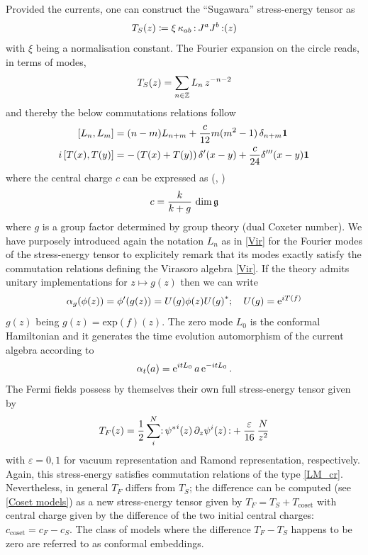 \bigskip
Provided the currents, one can construct the ``Sugawara''
stress-energy tensor as
\begin{equation}
\label{SET}
T_S(z)\coloneqq \xi\,\kappa_{ab}\,\wick{\,J^a J^b\,}(z)
\end{equation}
with $\xi$ being a normalisation constant. The
Fourier expansion on the circle reads, in terms of modes,
\[
T_S(z)=\sum_{n\in\mathbb{Z}} L_n\,z^{-n-2}
\]
and thereby the below commutations relations follow
\begin{align}
[L_n,L_m]&=(n-m)L_{n+m} + \frac{c}{12} m(m^2-1)\,
     \delta_{n+m}\bm{1}\notag \\ 
i\,[T(x),T(y)]&=-\left(T(x)+T(y)\right)\delta'(x-y)
     + \frac{c}{24}\delta'''(x-y)\bm{1} \label{LM_cr}
\end{align}
where the central charge $c$ can be expressed as 
(\cite{dFMS:1997}, \cite{Fuchs:1992})
\begin{equation}
\label{coxeter}
c=\frac{k}{k+g}\,\operatorname{dim}\mathfrak{g}
\end{equation}
where $g$ is a group factor determined by group theory (dual
Coxeter number). We have purposely introduced again the 
notation $L_n$ as in
\eqref{Vir} for the Fourier modes of the stress-energy tensor
to explicitely remark that its modes exactly satisfy the
commutation relations defining the Virasoro algebra \eqref{Vir}.
If the theory admits unitary implementations for $z\mapsto g(z)$
then we can write
\[
\alpha_g(\phi(z))=\phi'(g(z))=U(g)\phi(z){U(g)}^*;\quad
U(g)=\operatorname{e}^{iT(f)}
\]
$g(z)$ being $g(z)=\textrm{exp}(f)(z)$.
The zero mode $L_0$ is the conformal Hamiltonian
and it generates the time evolution automorphism
of the current algebra according to
\[
\alpha_t(a)=\operatorname{e}^{itL_0}a\operatorname{e}^{-itL_0}.
\]
The Fermi fields possess by themselves their own 
full stress-energy tensor given by 
\begin{equation}
\label{SET_vac_vs_R}
T_F(z)=\frac{1}{2} \sum_i^N\wick{\,{\psi^*}^i(z)\,
\partial_z\psi^i(z)\,} + \frac{\varepsilon}{16}\,\frac{N}{z^2}
\end{equation}
with $\varepsilon=0,1$ for vacuum representation 
and Ramond representation, respectively. Again, this 
stress-energy satisfies commutation relations of the 
type \eqref{LM_cr}. Nevertheless, in general 
$T_F$ differs from $T_S$; the difference can be computed 
(see \ref{Coset models}) as a new stress-energy tensor
given by $T_F=T_S+T_{\textrm{coset}}$ with central charge 
given by the difference of the two initial central charges:
$c_{\textrm{coset}}=c_F-c_S$. The class of models 
where the difference $T_F-T_S$ happens to be zero are 
referred to as conformal embeddings.




